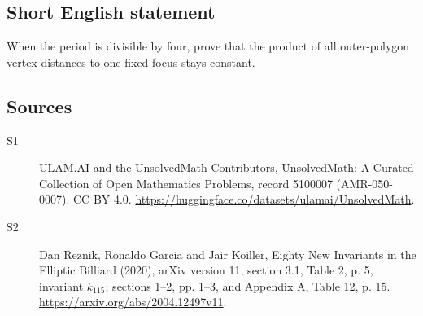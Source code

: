 \documentclass[11pt]{article}
\begin{document}
\subsection{Short English statement}
When the period is divisible by four, prove that the product of all outer-polygon vertex distances to one fixed focus stays constant.
\subsection{Sources}
\begin{description}
\item[\hypertarget{source:5100007:1}{S1}] ULAM.AI and the UnsolvedMath Contributors, UnsolvedMath: A Curated Collection of Open Mathematics Problems, record 5100007 (AMR-050-0007). CC BY 4.0. \url{https://huggingface.co/datasets/ulamai/UnsolvedMath}.
\item[\hypertarget{source:5100007:2}{S2}] Dan Reznik, Ronaldo Garcia and Jair Koiller, Eighty New Invariants in the Elliptic Billiard (2020), arXiv version 11, section 3.1, Table 2, p. 5, invariant $k_{115}$; sections 1--2, pp. 1--3, and Appendix A, Table 12, p. 15. \url{https://arxiv.org/abs/2004.12497v11}.
\end{description}
\label{end:5100007}
\end{document}
